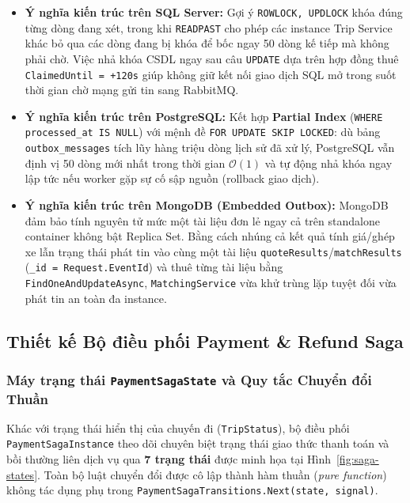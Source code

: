 \documentclass[12pt,a4paper]{article}
\begin{document}
\begin{itemize}[nosep]
    \item \textbf{Ý nghĩa kiến trúc trên SQL Server:} Gợi ý \texttt{ROWLOCK, UPDLOCK} khóa đúng từng dòng đang xét, trong khi \texttt{READPAST} cho phép các instance Trip Service khác bỏ qua các dòng đang bị khóa để bốc ngay 50 dòng kế tiếp mà không phải chờ. Việc nhả khóa CSDL ngay sau câu \texttt{UPDATE} dựa trên hợp đồng thuê \texttt{ClaimedUntil = +120s} giúp không giữ kết nối giao dịch SQL mở trong suốt thời gian chờ mạng gửi tin sang RabbitMQ.
    \item \textbf{Ý nghĩa kiến trúc trên PostgreSQL:} Kết hợp \textbf{Partial Index} (\texttt{WHERE processed\_at IS NULL}) với mệnh đề \texttt{FOR UPDATE SKIP LOCKED}: dù bảng \texttt{outbox\_messages} tích lũy hàng triệu dòng lịch sử đã xử lý, PostgreSQL vẫn định vị 50 dòng mới nhất trong thời gian $\mathcal{O}(1)$ và tự động nhả khóa ngay lập tức nếu worker gặp sự cố sập nguồn (rollback giao dịch).
    \item \textbf{Ý nghĩa kiến trúc trên MongoDB (Embedded Outbox):} MongoDB đảm bảo tính nguyên tử mức một tài liệu đơn lẻ ngay cả trên standalone container không bật Replica Set. Bằng cách nhúng cả kết quả tính giá/ghép xe lẫn trạng thái phát tin vào cùng một tài liệu \texttt{quoteResults}/\texttt{matchResults} (\texttt{\_id = Request.EventId}) và thuê từng tài liệu bằng \texttt{FindOneAndUpdateAsync}, \texttt{MatchingService} vừa khử trùng lặp tuyệt đối vừa phát tin an toàn đa instance.
\end{itemize}

\subsection{Thiết kế Bộ điều phối Payment \& Refund Saga}
\subsubsection{Máy trạng thái \texttt{PaymentSagaState} và Quy tắc Chuyển đổi Thuần}
Khác với trạng thái hiển thị của chuyến đi (\texttt{TripStatus}), bộ điều phối \texttt{PaymentSagaInstance} theo dõi chuyên biệt trạng thái giao thức thanh toán và bồi thường liên dịch vụ qua \textbf{7 trạng thái} được minh họa tại Hình~\ref{fig:saga-states}. Toàn bộ luật chuyển đổi được cô lập thành hàm thuần (\textit{pure function}) không tác dụng phụ trong \texttt{PaymentSagaTransitions.Next(state, signal)}.
\end{document}
